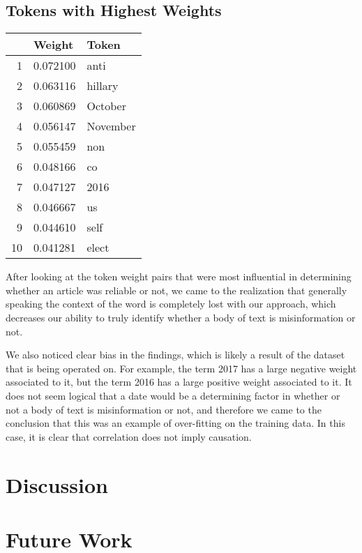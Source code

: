 \documentclass[12pt]{article}
\begin{document}
    \subsection{Tokens with Highest Weights}
	\begin{tabular}{r | l l}
		                & Weight & Token & \\
		\hline
		1   & 0.072100	        & anti          \\
		2   & 0.063116		    & hillary       \\
		3   & 0.060869          & October       \\
		4   & 0.056147	        & November      \\
		5   & 0.055459	        & non           \\
		6   & 0.048166	        & co            \\
		7   & 0.047127	        & 2016          \\
		8   & 0.046667	        & us            \\
		9   & 0.044610	        & self          \\
		10  & 0.041281          & elect         \\
	\end{tabular}

	\break

    After looking at the token weight pairs that were most influential in determining whether an article was reliable or not, we came to the realization that generally speaking the context of the word is completely lost with our approach, which decreases our ability to truly identify whether a body of text is misinformation or not.

    We also noticed clear bias in the findings, which is likely a result of the dataset that is being operated on. For example, the term 2017 has a large negative weight associated to it, but the term 2016 has a large positive weight associated to it. It does not seem logical that a date would be a determining factor in whether or not a body of text is misinformation or not, and therefore we came to the conclusion that this was an example of over-fitting on the training data. In this case, it is clear that correlation does not imply causation.

	\section{Discussion}
	\section{Future Work}
\end{document}
